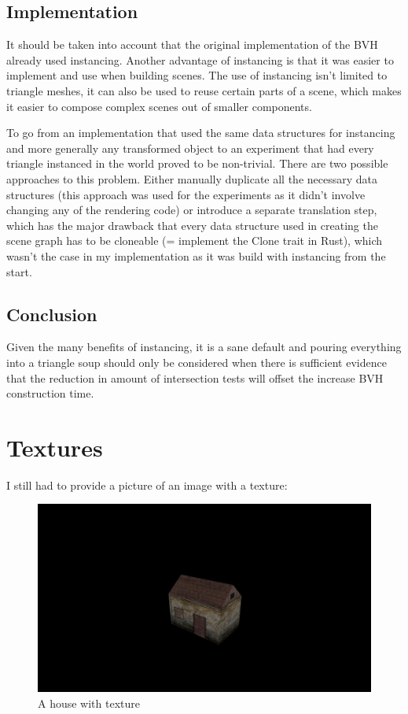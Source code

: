 \documentclass{article}
\begin{document}
\subsection{Implementation}

It should be taken into account that the original implementation of the BVH already used instancing. Another advantage of instancing is that it was easier to implement and use when building scenes. The use of instancing isn't limited to triangle meshes, it can also be used to reuse certain parts of a scene, which makes it easier to compose complex scenes out of smaller components.

To go from an implementation that used the same data structures for instancing and more generally any transformed object to an experiment that had every triangle instanced in the world proved to be non-trivial. There are two possible approaches to this problem. Either manually duplicate all the necessary data structures (this approach was used for the experiments as it didn't involve changing any of the rendering code) or introduce a separate translation step, which has the major drawback that every data structure used in creating the scene graph has to be cloneable (= implement the Clone trait in Rust), which wasn't the case in my implementation as it was build with instancing from the start.

\subsection{Conclusion}

Given the many benefits of instancing, it is a sane default and pouring everything into a triangle soup should only be considered when there is sufficient evidence that the reduction in amount of intersection tests will offset the increase BVH construction time.

\section{Textures}

I still had to provide a picture of an image with a texture:
\begin{figure}[hb]
    \centering
    \includegraphics[width=12cm]{renders/house.png}
    \caption{A house with texture}
\end{figure}
\end{document}
